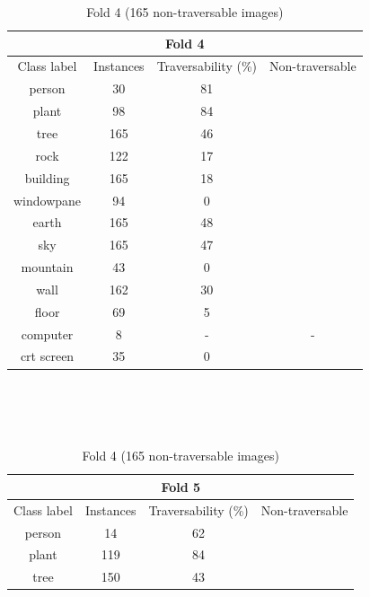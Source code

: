\documentclass[12pt,a4paper,table,dvipsnames,tikz]{report}
\begin{document}
	\begin{table}[h!]
		\ContinuedFloat %
		\begin{subtable}[h!]{\textwidth}
			\centering
			\begin{tabular}{|c|c|c|c|}
				\hline
				\multicolumn{4}{|c|}{Fold 4}\\
				\hline
				Class label & Instances & Traversability (\%) & Non-traversable\\
				\hline\hline
				person & 30 & 81 &\\
				\hline
				plant & 98 & 84 &\\
				\hline
				\rowcolor{tree}
				tree & 165 & 46 & \checkmark\\
				\hline
				rock & 122 & 17 & \checkmark\\
				\hline
				building & 165 & 18 & \checkmark\\
				\hline
				windowpane & 94 & 0 & \checkmark\\
				\hline
				\rowcolor{earth}
				earth & 165 & 48 & \checkmark\\
				\hline
				\rowcolor{sky}
				sky & 165 & 47 & \checkmark\\
				\hline
				mountain & 43 & 0 & \checkmark\\
				\hline
				wall & 162 & 30 & \checkmark\\
				\hline
				floor & 69 & 5 & \checkmark\\
				\hline
				computer & 8 & - & -\\
				\hline
				crt screen & 35 & 0 & \checkmark\\
				\hline
			\end{tabular}
			\caption{Fold 4 (165 non-traversable images)}
			\label{table:obst.f4}
		\end{subtable}
		\\\\\\	
		\begin{subtable}[h!]{\textwidth}
			\centering
			\begin{tabular}{|c|c|c|c|}
				\hline
				\multicolumn{4}{|c|}{Fold 5}\\
				\hline
				Class label & Instances & Traversability (\%) & Non-traversable\\
				\hline\hline
				person & 14 & 62 &\\
				\hline
				plant & 119 & 84 &\\
				\hline
				\rowcolor{tree}
				tree & 150 & 43 & \checkmark\\

\end{tabular}
\end{subtable}
\end{table}
\end{document}
